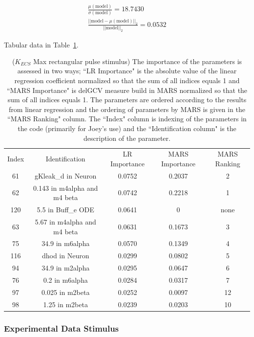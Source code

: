 \documentclass[12pt]{article}
\numberwithin{equation}{section}
\begin{document}
\begin{eqnarray*}
\frac{\mu(\text{model})}{\sigma(\text{model})} = 18.7430\\
\frac{\vert \vert \text{model}-\mu(\text{model}) \vert \vert_2 }{\vert \vert \text{model}\vert \vert_2 } = 0.0532
\end{eqnarray*}

Tabular data in Table~\ref{qoi_K_ECS_Max_rec}.

\begin{table}[h]
\centering
\begin{tabular}{ccccc}
Index & Identification & LR Importance & MARS Importance & MARS Ranking \\

61 & gKleak\_d in Neuron & 0.0752 &  0.2037 & 2\\
62 & 0.143 in m4alpha and m4 beta & 0.0742 & 0.2218 & 1\\
120 & 5.5 in Buff\_e ODE & 0.0641 & 0 & none\\
63 &   5.67 in m4alpha and m4 beta & 0.0631 & 0.1673 & 3\\
75 & 34.9 in m6alpha & 0.0570 & 0.1349 & 4\\
116 & dhod in Neuron & 0.0299 & 0.0802 & 5\\
94 & 34.9 in m2alpha & 0.0295 & 0.0647 & 6\\
76 & 0.2 in m6alpha & 0.0284 & 0.0317 &7\\
97 & 0.025 in m2beta & 0.0252 & 0.0097 & 12\\
98 & 1.25 in m2beta & 0.0239 & 0.0203 & 10\\
\end{tabular}
\caption{ ($K_{ECS}$ Max rectangular pulse stimulus) The importance of the parameters is assessed in two ways; ``LR Importance" is the absolute value of the linear regression coefficient normalized so that the sum of all indices equals 1 and ``MARS Importance" is delGCV measure build in MARS normalized so that the sum of all indices equals 1. The parameters are ordered according to the results from linear regression and the ordering of parameters by MARS is given in the ``MARS Ranking" column. The ``Index" column is indexing of the parameters in the code (primarily for Joey's use) and the ``Identification column" is the description of the parameter.}
\label{qoi_K_ECS_Max_rec}
\end{table}

\newpage

\subsubsection{Experimental Data Stimulus}
\end{document}

